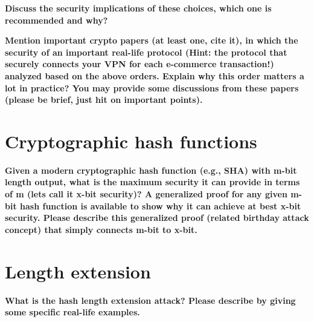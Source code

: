 \documentclass[letterpaper,11pt,notitlepage,fleqn]{article}
\begin{document}
\noindent \textbf{Discuss the security implications of these choices, which one is recommended and why?}

\noindent \textbf{Mention important crypto papers (at least one, cite it), in which the security of an important real-life  protocol  (Hint:  the  protocol  that  securely  connects  your  VPN  for  each  e-commerce transaction!)  analyzed  based  on  the  above  orders.  Explain  why  this  order  matters  a  lot  in practice?  You  may  provide  some  discussions  from  these  papers  (please  be  brief,  just  hit  on important points).}

\section{Cryptographic  hash  functions}
\noindent \textbf{Given  a modern  cryptographic  hash  function  (e.g.,  SHA) with m-bit  length  output, what is  the maximum  security  it  can  provide  in  terms  of  m  (lets  call  it  x-bit  security)? A  generalized proof  for  any  given  m-bit  hash  function  is  available  to  show  why  it  can  achieve  at  best  x-bit security.  Please  describe  this  generalized  proof  (related  birthday  attack  concept)  that  simply connects m-bit to x-bit.}

\section{Length extension}
\noindent \textbf{What  is  the  hash  length  extension  attack?  Please  describe  by  giving  some  specific  real-life examples.}
\end{document}
